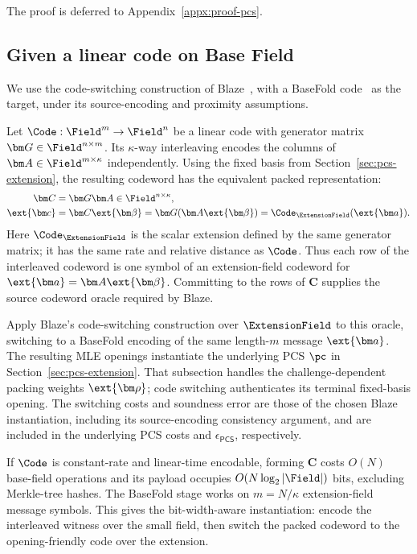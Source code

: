 The proof is deferred to Appendix~\ref{appx:proof-pcs}.

\subsection{Given a linear code on Base Field}
\label{sec:pcs-base-code}

We use the code-switching construction of
Blaze~\cite{eurocrypt/BrehmCFRRZ25}, with a BaseFold
code~\cite{crypto/ZeilbergerCF24} as the target, under its
source-encoding and proximity assumptions.

Let \(\Code:\Field^m\to\Field^n\) be a linear code with
generator matrix \(\bm G\in\Field^{n\times m}\).
Its \(\kappa\)-way interleaving encodes the columns of
\(\bm A\in\Field^{m\times\kappa}\) independently.
Using the fixed basis from Section~\ref{sec:pcs-extension},
the resulting codeword has the equivalent packed representation:
\begin{equation}
\begin{aligned}
    \bm C&=\bm G\bm A\in\Field^{n\times\kappa},\\
    \ext{\bm c}&=\bm C\ext{\bm\beta}
       =\bm G(\bm A\ext{\bm\beta})
       =\Code_{\ExtensionField}(\ext{\bm a}).
\end{aligned}
\label{eq:pcs-code-packing}
\end{equation}
Here \(\Code_{\ExtensionField}\) is the scalar extension defined
by the same generator matrix; it has the same rate and relative
distance as \(\Code\).
Thus each row of the interleaved codeword is one symbol of an
extension-field codeword for \(\ext{\bm a}=\bm A\ext{\bm\beta}\).
Committing to the rows of \(\bm C\) supplies the source codeword
oracle required by Blaze.

Apply Blaze's code-switching construction over \(\ExtensionField\)
to this oracle, switching to a BaseFold encoding of the same
length-\(m\) message \(\ext{\bm a}\).
The resulting MLE openings instantiate the underlying PCS \(\pc\)
in Section~\ref{sec:pcs-extension}.
That subsection handles the challenge-dependent packing weights
\(\ext{\bm\rho}\); code switching authenticates its terminal
fixed-basis opening.
The switching costs and soundness error are those of the chosen
Blaze instantiation, including its source-encoding consistency
argument, and are included in the underlying PCS costs and
\(\epsilon_{\mathsf{PCS}}\), respectively.

If \(\Code\) is constant-rate and linear-time encodable, forming
\(\bm C\) costs \(O(N)\) base-field operations and its payload
occupies \(O(N\log_2|\Field|)\) bits, excluding Merkle-tree hashes.
The BaseFold stage works on \(m=N/\kappa\) extension-field
message symbols. This gives the bit-width-aware instantiation:
encode the interleaved witness over the small field, then switch
the packed codeword to the opening-friendly code over the extension.
